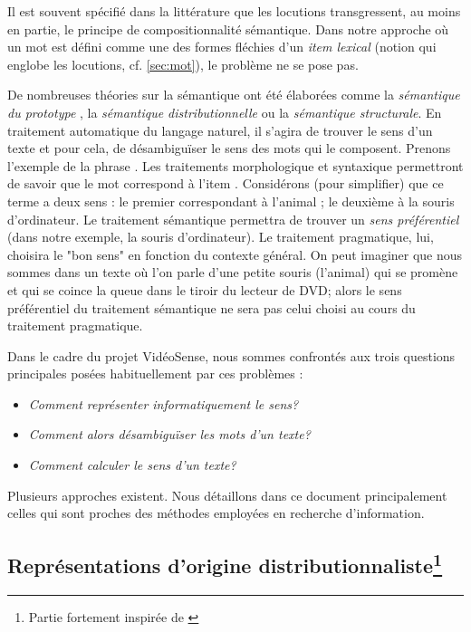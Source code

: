 Il est souvent spécifié dans la littérature que les locutions
transgressent, au moins en partie, le principe de compositionnalité
sémantique. Dans notre approche où un mot est défini comme une des
formes fléchies d'un \emph{item lexical} (notion qui englobe les
locutions, cf.  \ref{sec:mot}), le problème ne se pose pas.

De nombreuses théories sur la sémantique ont été élaborées comme la
\emph{sémantique du prototype} \cite{Kleiber1990}, la \emph{sémantique
  distributionnelle} ou la \emph{sémantique structurale}. 
En traitement automatique du langage naturel, il s'agira de trouver le
sens d'un texte et pour cela, de désambiguïser le sens des mots qui le
composent. Prenons l'exemple de la phrase . Les traitements morphologique et syntaxique
permettront de savoir que le mot  correspond à l'item
.  Considérons (pour simplifier) que ce terme a deux
sens : le premier correspondant à l'animal ; le deuxième à la souris
d'ordinateur. Le traitement sémantique permettra de trouver un
\emph{sens préférentiel} (dans notre exemple, la souris d'ordinateur).
Le traitement pragmatique, lui, choisira le "bon sens" en fonction du
contexte général. On peut imaginer que nous sommes dans un texte où
l'on parle d'une petite souris (l'animal) qui se promène et qui se
coince la queue dans le tiroir du lecteur de DVD; alors le sens
préférentiel du traitement sémantique ne sera pas celui choisi au
cours du traitement pragmatique.

Dans le cadre du projet VidéoSense, nous sommes confrontés aux trois questions principales
posées habituellement par ces problèmes :

\begin{itemize}
  
\item \emph{Comment représenter informatiquement le sens?}
  
\item \emph{Comment alors désambiguïser les mots d'un texte?}
  
\item \emph{Comment calculer le sens d'un texte?}

\end{itemize}

Plusieurs approches existent. Nous détaillons dans ce document principalement celles qui sont proches des méthodes employées en recherche d'information.

\subsection[Représentations d'origine distributionnaliste]{Représentations d'origine distributionnaliste\footnote{Partie fortement inspirée de \cite{schwab2005th}}}

